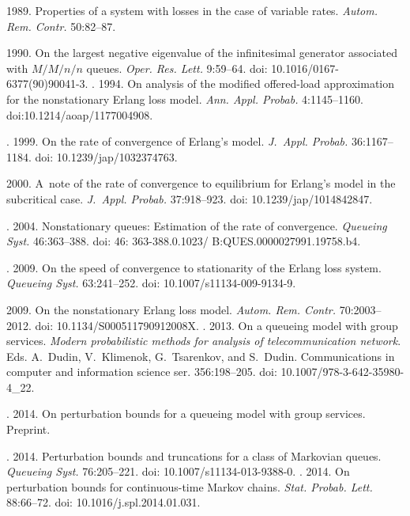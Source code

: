 {\begin{multicols}{2}
{{\begin{thebibliography}{99}
 1989. Properties of a system with losses in the
case of variable rates. \textit{Autom. Rem. Contr.} 50:82--87.

 1990. On the largest negative eigenvalue of the infinitesimal
generator associated with $M/M/n/n$ queues. \textit{Oper. Res. Lett.}
9:59--64. doi: 10.1016/0167-6377(90)90041-3.
. 1994.
On analysis of the modified offered-load approximation for the nonstationary
Erlang loss model. \textit{Ann. Appl. Probab.} 4:1145--1160.
doi:10.1214/aoap/1177004908.

. 1999. On the rate of
convergence of Erlang's model. \textit{J.~Appl. Probab.} 36:1167--1184.
doi: 10.1239/jap/1032374763.


 2000. A~note of the rate of convergence to equilibrium for
Erlang's model in the subcritical case. \textit{J.~Appl. Probab.} 37:918--923.
doi: 10.1239/jap/1014842847.

. 2004.
Nonstationary queues: Estimation of the rate of convergence.
\textit{Queueing Syst.} 46:363--388.
doi: 46: 363-388.0.1023/ B:QUES.0000027991.19758.b4.

.
2009. On the speed of convergence to stationarity of the Erlang loss system.
\textit{Queueing Syst.} 63:241--252. doi: 10.1007/s11134-009-9134-9.


 2009. On the nonstationary Erlang loss model.
\textit{Autom. Rem. Contr.} 70:2003--2012. doi: 10.1134/S000511790912008X.
.
2013. On a queueing model with group services.
\textit{Modern probabilistic methods for
analysis of telecommunication network}.
Eds. A.~Dudin, V.~Klimenok, G.~Tsarenkov, and S.~Dudin.
{Communications in computer and information science ser.}
356:198--205. doi: 10.1007/978-3-642-35980-4\_22.

.
2014. On perturbation bounds for a queueing model with group services. Preprint.

.
2014. Perturbation bounds and truncations for a class of Markovian queues.
\textit{Queueing Syst.} 76:205--221.
doi: 10.1007/s11134-013-9388-0.
. 2014. On perturbation
bounds for continuous-time Markov chains.
\textit{Stat. Probab. Lett.} 88:66--72. doi: 10.1016/j.spl.2014.01.031.


\end{thebibliography}}}
\end{multicols}}
